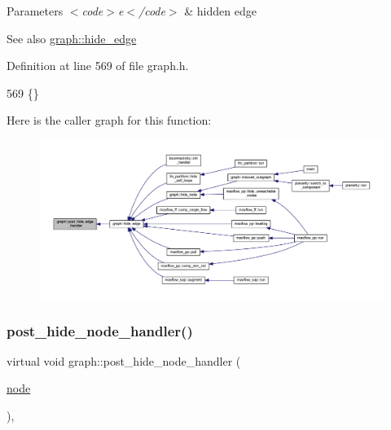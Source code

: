 \begin{DoxyParams}{Parameters}
{\em $<$code$>$e$<$/code$>$} & hidden edge \\
\hline
\end{DoxyParams}
\begin{DoxySeeAlso}{See also}
\mbox{\hyperlink{classgraph_ab2f8520bcac080d73c55228fecc61825}{graph\+::hide\+\_\+edge}} 
\end{DoxySeeAlso}


Definition at line 569 of file graph.\+h.


\begin{DoxyCode}
569 \{\}         
\end{DoxyCode}
Here is the caller graph for this function\+:
\nopagebreak
\begin{figure}[H]
\begin{center}
\leavevmode
\includegraphics[width=350pt]{classgraph_ad4614e74a125054eb3e180f6f32ab7bb_icgraph}
\end{center}
\end{figure}
\mbox{\label{classgraph_a50cb72a1e81d0a3d68965a1e6070edb3}} 
\subsubsection{\texorpdfstring{post\+\_\+hide\+\_\+node\+\_\+handler()}{post\_hide\_node\_handler()}}
{\footnotesize\ttfamily virtual void graph\+::post\+\_\+hide\+\_\+node\+\_\+handler (\begin{DoxyParamCaption}\item[{\mbox{\hyperlink{classnode}{node}}}]{ }\end{DoxyParamCaption})\hspace{0.3cm}{\ttfamily [inline]}, {\ttfamily [virtual]}}

